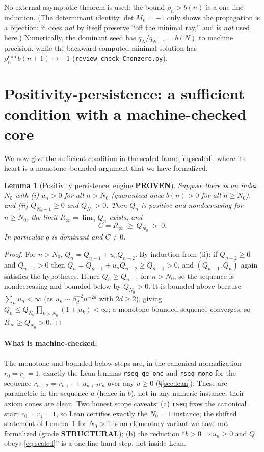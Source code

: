 \documentclass[11pt]{article}
\newtheorem{lemma}{Lemma}
\newcommand{\Rinf}{R_\infty}
\begin{document}
No external asymptotic theorem is used: the bound $\rho_n>b(n)$ is a one-line
induction. (The determinant identity $\det M_n=-1$ only shows the propagation is a
bijection; it does \emph{not} by itself preserve ``off the minimal ray,'' and is
\emph{not} used here.) Numerically, the dominant seed has $q_N/q_{N-1}=b(N)$ to
machine precision, while the backward-computed minimal solution has
$\rho^{\min}_n\,b(n+1)\to-1$ (\texttt{review\_check\_Cnonzero.py}).

\section{Positivity-persistence: a sufficient condition with a machine-checked core}
\label{sec:lemmaP}

We now give the sufficient condition in the scaled frame \eqref{eq:scaled}, where
its heart is a monotone--bounded argument that we have formalized.

\begin{lemma}[Positivity persistence; engine \textbf{PROVEN}]\label{lem:P}
Suppose there is an index $N_0$ with
\textup{(i)} $u_n>0$ for all $n>N_0$ \textup{(}guaranteed once $b(n)>0$ for all
$n\ge N_0$\textup{)}, and \textup{(ii)} $Q_{N_0-1}\ge0$ and $Q_{N_0}>0$. Then $Q_n$
is positive and nondecreasing for $n\ge N_0$, the limit $\Rinf=\lim_n Q_n$ exists,
and
\[
  C=\Rinf\ \ge\ Q_{N_0}\ >\ 0 .
\]
In particular $q$ is dominant and $C\neq0$.
\end{lemma}

\begin{proof}
For $n>N_0$, $Q_n=Q_{n-1}+u_nQ_{n-2}$. By induction from (ii): if $Q_{n-2}\ge0$ and
$Q_{n-1}>0$ then $Q_n=Q_{n-1}+u_nQ_{n-2}\ge Q_{n-1}>0$, and $(Q_{n-1},Q_n)$ again
satisfies the hypotheses. Hence $Q_n\ge Q_{n-1}$ for $n>N_0$, so the sequence is
nondecreasing and bounded below by $Q_{N_0}>0$. It is bounded above because
$\sum_n u_n<\infty$ (as $u_n\sim\beta_d^{-2}n^{-2d}$ with $2d\ge2$), giving
$Q_n\le Q_{N_0}\prod_{k>N_0}(1+u_k)<\infty$; a monotone bounded sequence converges,
so $\Rinf\ge Q_{N_0}>0$.
\end{proof}

\paragraph{What is machine-checked.}
The monotone and bounded-below steps are, in the canonical normalization
$r_0=r_1=1$, exactly the Lean lemmas \texttt{rseq\_ge\_one} and \texttt{rseq\_mono}
for the sequence $r_{n+2}=r_{n+1}+u_{n+2}r_n$ over any $u\ge0$
(\S\ref{sec:lean}). These are parametric in the sequence $u$ (hence in $b$), not in
any numeric instance; their axiom cones are clean. Two honest scope caveats:
(a) \texttt{rseq} fixes the canonical start $r_0=r_1=1$, so Lean certifies exactly
the $N_0=1$ instance; the shifted statement of Lemma~\ref{lem:P} for $N_0>1$ is an
elementary variant we have not formalized (grade \textbf{STRUCTURAL});
(b) the reduction ``$b>0\Rightarrow u_n\ge0$ and $Q$ obeys \eqref{eq:scaled}'' is a
one-line hand step, not inside Lean.
\end{document}
